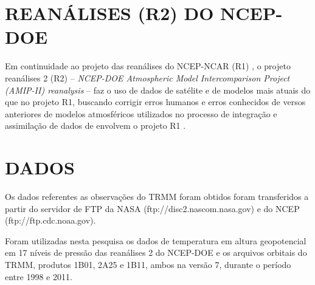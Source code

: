 


\section{REANÁLISES (R2) DO NCEP-DOE}

Em continuidade ao projeto das reanálises do NCEP-NCAR (R1) , o projeto reanálises 2 (R2)   -- \textit{NCEP-DOE Atmospheric Model Intercomparison Project (AMIP-II) reanalysis} -- faz o uso de dados de satélite e de modelos mais atuais do que no projeto R1, buscando corrigir erros humanos e erros conhecidos de versos anteriores de modelos atmosféricos utilizados no processo de integração e assimilação de dados de envolvem o projeto R1 \cite{kanamitsu}.




\section{DADOS}

Os dados referentes as observações do TRMM foram obtidos foram transferidos a partir do servidor de FTP da NASA (ftp://disc2.nascom.nasa.gov) e do NCEP (ftp://ftp.cdc.noaa.gov).

Foram utilizadas nesta pesquisa os dados de temperatura em altura geopotencial em 17 níveis de pressão das reanálises 2 do NCEP-DOE e os arquivos orbitais do TRMM, produtos 1B01, 2A25 e 1B11, ambos na versão 7, durante o período entre 1998 e 2011. 

